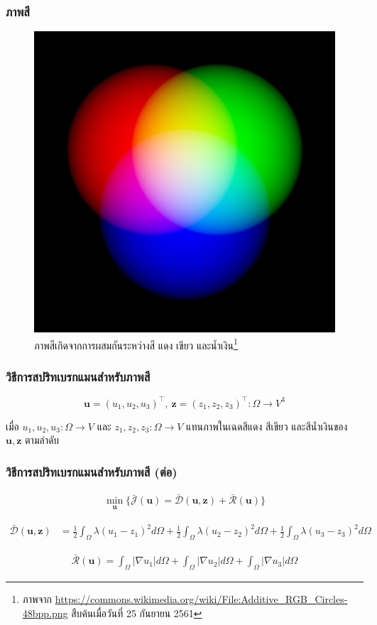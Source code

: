 \documentclass[xcolor=dvipsnames, xetex,serif]{beamer}
\numberwithin{equation}{section}
\begin{document}
		\begin{frame}
			\frametitle{ภาพสี}
			\begin{figure}[H]
				\centering
				\includegraphics[width=0.4\linewidth]{images/rgb-space.png}
				\caption{ภาพสีเกิดจากการผสมกันระหว่างสี แดง เขียว และน้ำเงิน\footnote{\tiny{ภาพจาก \url{https://commons.wikimedia.org/wiki/File:Additive_RGB_Circles-48bpp.png}  สืบค้นเมื่อวันที่ 25 กันยายน 2561}}}
				\label{image:rgb-space}
			\end{figure}
		\end{frame}
		\begin{frame}
			\frametitle{วิธีการสปริทเบรกแมนสำหรับภาพสี}
			$$ \boldsymbol{u} = (u_1,u_2,u_3)^{\top},\ \boldsymbol{z} = (z_1,z_2,z_3)^{\top} : \Omega  \rightarrow V^3 $$
			
			\noindent เมื่อ $u_1,u_2,u_3: \Omega  \rightarrow V$ และ $z_1,z_2,z_3: \Omega  \rightarrow V$ แทนภาพในเฉดสีแดง สีเขียว และสีน้ำเงินของ $\boldsymbol{u},\boldsymbol{z}$ ตามลำดับ 
		\end{frame}
		\begin{frame}
			\frametitle{วิธีการสปริทเบรกแมนสำหรับภาพสี (ต่อ)}
			\begin{align*}
			\min_{\boldsymbol{u}} \{ \bar{\mathcal{J}}(\boldsymbol{u})= \mathcal{\bar{D}}(\boldsymbol{u},\boldsymbol{z})+  \mathcal{\bar{R}}(\boldsymbol{u}) \}
			\label{e10}
			\end{align*}
			
			\begin{align*}
			\mathcal{\bar{D}}(\boldsymbol{u},\boldsymbol{z}) 
			&= \frac{1}{2}\int_{\Omega}^{}\lambda(u_1 - z_1)^2 d\Omega + \frac{1}{2}\int_{\Omega}^{}\lambda(u_2 - z_2)^2 d\Omega + \frac{1}{2}\int_{\Omega}^{}\lambda(u_3 - z_3)^2 d\Omega
			\end{align*}
			
			\begin{align*}
			\mathcal{\bar{R}}(\boldsymbol{u})= \int_{\Omega}^{}\lvert\nabla u_1 \rvert d\Omega + \int_{\Omega}^{}\lvert\nabla u_2 \rvert d\Omega + \int_{\Omega}^{}\lvert\nabla u_3 \rvert d\Omega
			\end{align*}
		\end{frame}
\end{document}
